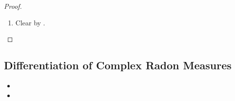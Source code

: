 \documentclass{book}
\begin{document}
\begin{proof}
\begin{enumerate}
\begin{align*}
				& \leq t \int_{E}  D_{\mu} \nu \dmu 
			\end{align*}
			Similarly, since 
			\begin{align*}
				\int_{E}  D_{\mu} \nu \dmu 
				& = \int_{E \cap Z^c} D_{\mu} \nu \dmu + \int_{E\cap Z} D_{\mu} \nu \dmu  \\
				& = \int_{E \cap Z^c} D_{\mu} \nu \dmu,
			\end{align*}
			we have that
			\begin{align*}
				\nu_{\mu}(E)
				& = \sum\limits_{m \in \Z} \nu_{\mu}(E_m) \\
				& \geq \sum\limits_{m \in \Z} t^m \mu(E_m) \\
				& = t^{-1} \sum\limits_{m \in \Z}  t^{m+1} \mu(E_m) \\
				& = t^{-1} \sum\limits_{m \in \Z} \int_{E_m} t^{m+1} \dmu \\
				& \geq t^{-1} \sum\limits_{m \in \Z} \int_{E_m} D_{\mu} \nu \dmu \\
				& = t^{-1} \int_{E\cap Z^c}  D_{\mu} \nu \dmu \\ 
				& = t^{-1} \int_{E}  D_{\mu} \nu \dmu 
			\end{align*}
			Thus 
			\begin{align*}
				t^{-1} \int_{E}  D_{\mu} \nu \dmu 
				& \leq \nu_{\mu}(E) \\
				& \leq t \int_{E}  D_{\mu} \nu \dmu 
			\end{align*}
			Since $t > 1$ is arbitrary, we have that
			$$\nu_{\mu}(E) = \int_{E}  D_{\mu} \nu \dmu.$$
			Since $E \in \MB(X)$ is arbitrary, we have that $D_{\mu} \nu = d \nu_{\mu}/d \mu$.
			\item Clear by .
		\end{enumerate}
	\end{proof}
	
	
	
	
	
	
	
	
	
	
	
	
	
	
	
	
	
	\subsection{Differentiation of Complex Radon Measures}
	\begin{itemize}
		\item {}
		\item {}
	\end{itemize}
	
\end{document}
